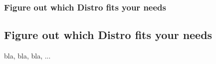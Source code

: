 \begin{frame}
	\frametitle{Figure out which Distro fits your needs}
	\subsection{Figure out which Distro fits your needs}
	
	bla, bla, bla, ...
\end{frame}
